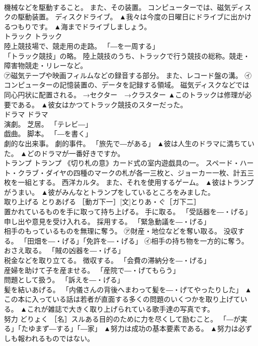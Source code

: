 \documentclass[8pt]{extreport}
\begin{document}
\begin{CJK}{UTF8}{min}
\\	機械などを駆動すること。 また、その装置。 コンピューターでは、磁気ディスクの駆動装置。 ディスクドライブ。	▲我々は今度の日曜日にドライブに出かけるつもりです。 ▲海までドライブしましょう。
\\	トラック	トラック	
\\	陸上競技場で、競走用の走路。 「―を一周する」 
\\	「トラック競技」の略。 陸上競技のうち、トラックで行う競技の総称。競走・障害物競走・リレーなど。 
\\	㋐磁気テープや映画フィルムなどの録音する部分。 また、レコード盤の溝。 ㋑コンピューターの記憶装置の、データを記録する領域。 磁気ディスクなどでは同心円状に配置される。 →セクター　→クラスター	▲このトラックは修理が必要である。 ▲彼女はかつてトラック競技のスターだった。
\\	ドラマ	ドラマ	
\\	演劇。 芝居。 「テレビ―」 
\\	戯曲。 脚本。 「―を書く」 
\\	劇的な出来事。 劇的事件。 「旅先で―がある」	▲彼は人生のドラマに満ちていた。 ▲どのドラマが一番好きですか。
\\	トランプ	トランプ	《切り札の意》カード式の室内遊戯具の一。 スペード・ハート・クラブ・ダイヤの四種のマークの札が各一三枚と、ジョーカー一枚、計五三枚を一組とする。 西洋カルタ。 また、それを使用するゲーム。	▲彼はトランプがうまい。 ▲彼がみんなとトランプをしているところをみました。
\\	取り上げる	とりあげる	［動ガ下一］[文]とりあ・ぐ［ガ下二］ 
\\	置かれているものを手に取って持ち上げる。 手に取る。 「受話器を―・げる」 
\\	申し出や意見を受け入れる。 採用する。 「緊急動議を―・げる」 
\\	相手のもっているものを無理に奪う。 ㋐財産・地位などを奪い取る。 没収する。 「田畑を―・げる」「免許を―・げる」 ㋑相手の持ち物を一方的に奪う。 おさえ取る。 「賊の凶器を―・げる」 
\\	税金などを取り立てる。 徴収する。 「会費の滞納分を―・げる」 
\\	産婦を助けて子を産ませる。 「産院で―・げてもらう」 
\\	問題として扱う。 「訴えを―・げる」 
\\	髪を結いあげる。 「内儀さんの背後へまわって髪を―・げてやったりした」	▲この本に入っている話は若者が直面する多くの問題のいくつかを取り上げている。 ▲これが雑誌で大きく取り上げられている歌手達の写真です。
\\	努力	どりょく	［名］スルある目的のために力を尽くして励むこと。 「―が実る」「たゆまず―する」「―家」	▲努力は成功の基本要素である。 ▲努力は必ずしも報われるものではない。

\end{CJK}
\end{document}
